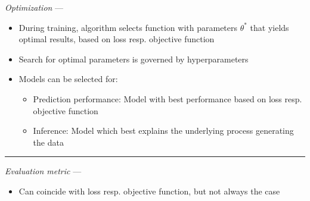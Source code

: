 \emph{Optimization} --- 
\begin{itemize}
    \item During training, algorithm selects function with parameters $\theta^*$ that yields optimal results, based on loss resp. objective function
    \item Search for optimal parameters is governed by hyperparameters
    \item Models can be selected for:
    \begin{itemize}
        \item Prediction performance: Model with best performance based on loss resp. objective function
        \item Inference: Model which best explains the underlying process generating the data
    \end{itemize}
\end{itemize}

{\color{lightgray}\hrule height 0.001mm}

\emph{Evaluation metric} --- 
\begin{itemize}
    \item Can coincide with loss resp. objective function, but not always the case
\end{itemize}